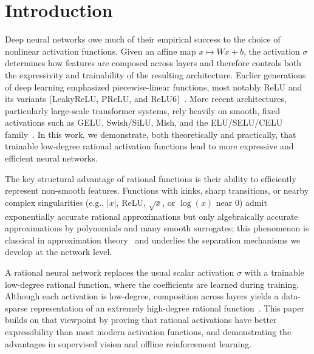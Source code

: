 \documentclass{article}
\theoremstyle{plain}
\theoremstyle{definition}
\theoremstyle{remark}
\begin{document}
\section{Introduction}
\label{sec:intro}

Deep neural networks owe much of their empirical success to the choice of nonlinear activation functions.  Given an affine map $x \mapsto Wx+b$, the activation $\sigma$ determines how features are composed across layers and therefore controls both the expressivity and trainability of the resulting architecture.  Earlier generations of deep learning emphasized piecewise-linear functions, most notably ReLU and its variants (LeakyReLU, PReLU, and ReLU6)~\cite{10.5555/3104322.3104425,maas2013rectifier,he2015delving,Sandler2018MobileNetV2IR}.  More recent architectures, particularly large-scale transformer systems, rely heavily on smooth, fixed activations such as GELU, Swish/SiLU, Mish, and the ELU/SELU/CELU family~\cite{Hendrycks2016GELU,ramachandran2017searching,ELFWING20183,misra2019mish,clevert2016elu,klambauer2017selfnormalizing,barron2017celu,Vaswani2017Transformer}.  In this work, we demonstrate, both theoretically and practically, that trainable low-degree rational activation functions lead to more expressive and efficient neural networks.

The key structural advantage of rational functions is their ability to efficiently represent non-smooth features.  Functions with kinks, sharp transitions, or nearby complex singularities (e.g., $|x|$, ReLU, $\sqrt{x}$, or $\log(x)$ near $0$) admit exponentially accurate rational approximations but only algebraically accurate approximations by polynomials and many smooth surrogates; this phenomenon is classical in approximation theory~\cite{trefethen2019approximation,gonchar2011rational} and underlies the separation mechanisms we develop at the network level.

A rational neural network replaces the usual scalar activation $\sigma$ with a trainable low-degree rational function, where the coefficients are learned during training.  Although each activation is low-degree, composition across layers yields a data-sparse representation of an extremely high-degree rational function~\cite{Telgarsky2017RationalFunctions,boulle2020rational}.  {This paper builds on that viewpoint by proving that rational activations have better expressibility than most modern activation functions, and demonstrating the advantages in supervised vision and offline reinforcement learning.}
\end{document}
